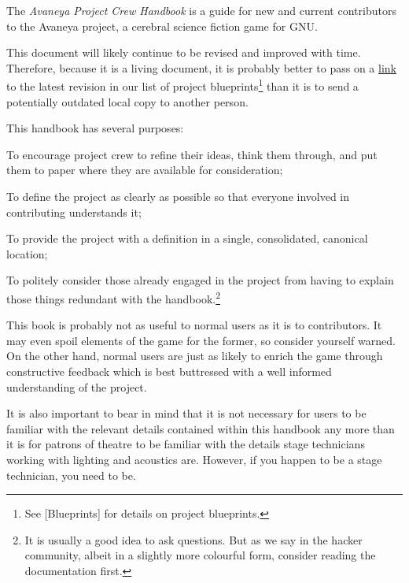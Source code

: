 

The {\it Avaneya Project Crew Handbook} is a guide for new and current contributors to the Avaneya project, a cerebral science fiction game for GNU. 

This document will likely continue to be revised and improved with time. Therefore, because it is a living document, it is probably better to pass on a \href{https://blueprints.launchpad.net/avaneya/+spec/avaneya-project-crew-handbook}{link} to the latest revision in our list of project blueprints\footnote[]{See [Blueprints] for details on project blueprints.} than it is to send a potentially outdated local copy to another person.

This handbook has several purposes:

\startitemize[4]
\item
To encourage project crew to refine their ideas, think them through, and put them to paper where they are available for consideration;

\item
To define the project as clearly as possible so that everyone involved in contributing understands it;

\item
To provide the project with a definition in a single, consolidated, canonical location;

\item
To politely consider those already engaged in the project from having to explain those things redundant with the handbook.\footnote[rtfm]{It is usually a good idea to ask questions. But as we say in the hacker community, albeit in a slightly more colourful form, consider reading the documentation first.}
\stopitemize

This book is probably not as useful to normal users as it is to contributors. It may even spoil elements of the game for the former, so consider yourself warned. On the other hand, normal users are just as likely to enrich the game through constructive feedback which is best buttressed with a well informed understanding of the project.

It is also important to bear in mind that it is not necessary for users to be familiar with the relevant details contained within this handbook any more than it is for patrons of theatre to be familiar with the details stage technicians working with lighting and acoustics are. However, if you happen to be a stage technician, you need to be.

\StopChapter

